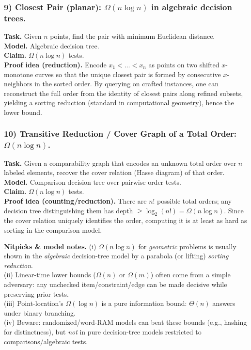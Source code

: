 \documentclass[9pt]{extarticle}
\begin{document}
\subsubsection{9) Closest Pair (planar): $\Omega(n\log n)$ in algebraic decision trees.}
\textbf{Task.} Given $n$ points, find the pair with minimum Euclidean distance.\\
\textbf{Model.} Algebraic decision tree.\\
\textbf{Claim.} $\Omega(n\log n)$ tests.\\
\textbf{Proof idea (reduction).} Encode $x_1<\dots<x_n$ as points on two shifted $\!x$-monotone curves so that the unique closest pair is formed by consecutive $x$-neighbors in the sorted order. By querying on crafted instances, one can reconstruct the full order from the identity of closest pairs along refined subsets, yielding a sorting reduction (standard in computational geometry), hence the lower bound.

\subsubsection{10) Transitive Reduction / Cover Graph of a Total Order: $\Omega(n\log n)$.}
\textbf{Task.} Given a comparability graph that encodes an unknown total order over $n$ labeled elements, recover the cover relation (Hasse diagram) of that order.\\
\textbf{Model.} Comparison decision tree over pairwise order tests.\\
\textbf{Claim.} $\Omega(n\log n)$ tests.\\
\textbf{Proof idea (counting/reduction).} There are $n!$ possible total orders; any decision tree distinguishing them has depth $\ge \log_2(n!)=\Omega(n\log n)$. Since the cover relation uniquely identifies the order, computing it is at least as hard as sorting in the comparison model.

\medskip
\noindent\textbf{Nitpicks \& model notes.}
(i) $\Omega(n\log n)$ for \emph{geometric} problems is usually shown in the \emph{algebraic} decision-tree model by a parabola (or lifting) \emph{sorting reduction}.\\
(ii) Linear-time lower bounds ($\Omega(n)$ or $\Omega(m)$) often come from a simple adversary: any unchecked item/constraint/edge can be made decisive while preserving prior tests.\\
(iii) Point-location’s $\Omega(\log n)$ is a pure information bound: $\Theta(n)$ answers under binary branching.\\
(iv) Beware: randomized/word-RAM models can beat these bounds (e.g., hashing for distinctness), but \emph{not} in pure decision-tree models restricted to comparisons/algebraic tests.
\end{document}
